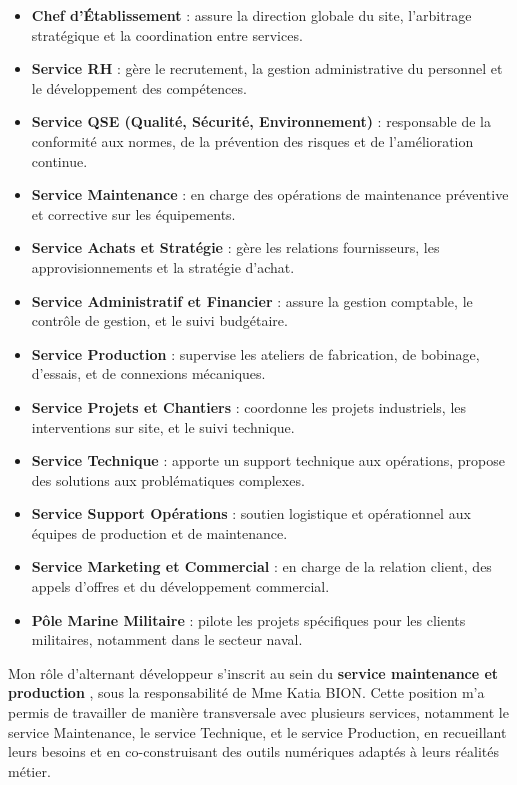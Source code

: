 \documentclass[11pt,a4paper]{article}
\begin{document}
\begin{itemize}
    \item \textbf{Chef d’Établissement} : assure la direction globale du site, l’arbitrage stratégique et la coordination entre services.

    \item \textbf{Service RH} : gère le recrutement, la gestion administrative du personnel et le développement des compétences.
    \item \textbf{Service QSE (Qualité, Sécurité, Environnement)} : responsable de la conformité aux normes, de la prévention des risques et de l'amélioration continue.
    \item \textbf{Service Maintenance} : en charge des opérations de maintenance préventive et corrective sur les équipements.
    \item \textbf{Service Achats et Stratégie} : gère les relations fournisseurs, les approvisionnements et la stratégie d'achat.
    \item \textbf{Service Administratif et Financier} : assure la gestion comptable, le contrôle de gestion, et le suivi budgétaire.
    \item \textbf{Service Production} : supervise les ateliers de fabrication, de bobinage, d’essais, et de connexions mécaniques.
    \item \textbf{Service Projets et Chantiers} : coordonne les projets industriels, les interventions sur site, et le suivi technique.
    \item \textbf{Service Technique} : apporte un support technique aux opérations, propose des solutions aux problématiques complexes.
    \item \textbf{Service Support Opérations} : soutien logistique et opérationnel aux équipes de production et de maintenance.
    \item \textbf{Service Marketing et Commercial} : en charge de la relation client, des appels d’offres et du développement commercial.
    \item \textbf{Pôle Marine Militaire} : pilote les projets spécifiques pour les clients militaires, notamment dans le secteur naval.
\end{itemize}

Mon rôle d’alternant développeur s’inscrit au sein du \textbf{service maintenance et production }, sous la responsabilité de Mme Katia BION. Cette position m’a permis de travailler de manière transversale avec plusieurs services, notamment le service Maintenance, le service Technique, et le service Production, en recueillant leurs besoins et en co-construisant des outils numériques adaptés à leurs réalités métier.
\end{document}
